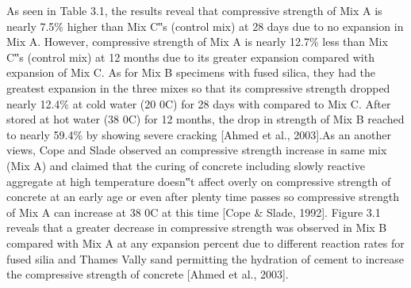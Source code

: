 As seen in Table 3.1, the results reveal that compressive strength of Mix A is nearly 7.5\% higher than Mix C‟s (control mix) at 28 days due to no expansion in Mix A. However, compressive strength of Mix A is nearly 12.7\% less than Mix C‟s (control mix) at 12 months due to its greater expansion compared with expansion of Mix C. As for Mix B specimens with fused silica, they had the greatest expansion in the three mixes so that its compressive strength dropped nearly 12.4\% at cold water (20 0C) for 28 days with compared to Mix C. After stored at hot water (38 0C) for 12 months, the drop in strength of Mix B reached to nearly 59.4\% by showing severe cracking [Ahmed et al., 2003].As an another views, Cope and Slade observed an compressive strength increase in same mix (Mix A) and claimed that the curing of concrete including slowly reactive aggregate at high temperature doesn‟t affect overly on compressive strength of concrete at an early age or even after plenty time passes so compressive strength of Mix A can increase at 38 0C at this time [Cope & Slade, 1992]. Figure 3.1 reveals that a greater decrease in compressive strength was observed in Mix B compared with Mix A at any expansion percent due to different reaction rates for fused silia and Thames Vally sand permitting the hydration of cement to increase the compressive strength of concrete [Ahmed et al., 2003].






 
